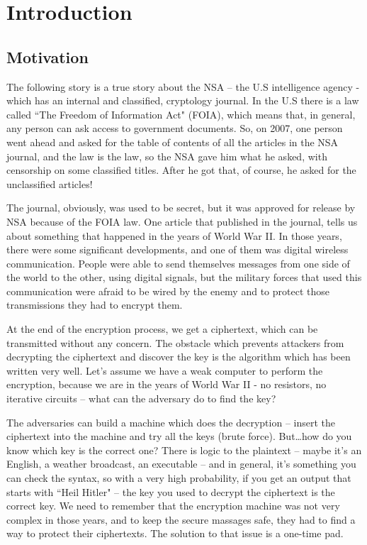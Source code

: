 \chapter{Introduction} \label{chap:c1_IntroductionAOI}

\section{Motivation} \label{sec:Motivation} %

The following story is a true story about the NSA – the U.S intelligence agency - which has an internal and classified, cryptology journal. In the U.S there is a law called ``The Freedom of Information Act" (FOIA), which means that, in general, any person can ask access to government documents. So, on 2007, one person went ahead and asked for the table of contents of all the articles in the NSA journal, and the law is the law, so the NSA gave him what he asked, with censorship on some classified titles. After he got that, of course, he asked for the unclassified articles!

The journal, obviously, was used to be secret, but it was approved for release by NSA because of the FOIA law. One article that published in the journal, tells us about something that happened in the years of World War II. In those years, there were some significant developments, and one of them was digital wireless communication. People were able to send themselves messages from one side of the world to the other, using digital signals, but the military forces that used this communication were afraid to be wired by the enemy and to protect those transmissions they had to encrypt them. 

At the end of the encryption process, we get a ciphertext, which can be transmitted without any concern. The obstacle which prevents attackers from decrypting the ciphertext and discover the key is the algorithm which has been written very well. 
Let's assume we have a weak computer to perform the encryption, because we are in the years of World War II - no resistors, no iterative circuits – what can the adversary do to find the key?

The adversaries can build a machine which does the decryption – insert the ciphertext into the machine and try all the keys (brute force). But\ldots how do you know which key is the correct one? There is logic to the plaintext – maybe it's an English, a weather broadcast, an executable – and in general, it's something you can check the syntax, so with a very high probability, if you get an output that starts with ``Heil Hitler" – the key you used to decrypt the ciphertext is the correct key. We need to remember that the encryption machine was not very complex in those years, and to keep the secure massages safe, they had to find a way to protect their ciphertexts. The solution to that issue is a one-time pad.

